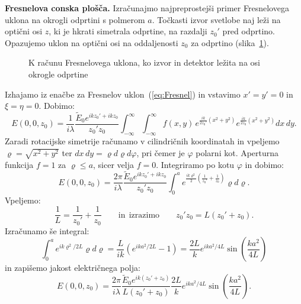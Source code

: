 \begin{example}{\bf Fresnelova conska plošča.}
Izračunajmo najpreprostejši primer Fresnelovega uklona na 
okrogli odprtini s polmerom $a$. Točkasti izvor svetlobe naj leži na 
optični osi $z$, ki je hkrati simetrala odprtine, na 
razdalji $z_0'$ pred odprtino. Opazujemo uklon
na optični osi na oddaljenosti $z_0$ za odprtino (slika~\ref{fig:05_FresCona}).
\begin{figure}[ht]
\centering
\def\svgwidth{100truemm} 

\caption{K računu Fresnelovega uklona, ko izvor in 
detektor ležita na osi okrogle odprtine}
\label{fig:05_FresCona}
\end{figure}

Izhajamo iz enačbe za Fresnelov uklon~(\ref{eq:Fresnel}) in vstavimo 
$x'=y'=0$ in $\xi = \eta = 0$. Dobimo:
\begin{equation}
E(0,0, z_0) = \frac{1}{i\lambda} \frac{\tilde{E}_0 
e^{ikz_0'+ikz_0}}{z_0'z_0} \int_{-\infty}^{\infty}
\int_{-\infty}^{\infty} f(x,y)\,
e^{\frac{ik}{2z_0'}(x^2+y^2)} e^{\frac{ik}{2z_0}(x^2+y^2)} dx\, dy.
\label{eq:05_77}
\end{equation}
Zaradi rotacijske simetrije računamo v cilindričnih koordinatah in 
vpeljemo $\varrho = \sqrt{x^2 + y^2}$ ter $dx\,dy = \varrho d\varrho d\varphi$,
pri čemer je $\varphi$ polarni kot. Aperturna funkcija $f=1$ 
za $\varrho \leq a$, sicer velja $f= 0$. Integriramo po kotu $\varphi$ 
in dobimo:
\begin{equation}
E(0,0, z_0) = \frac{2\pi }{i\lambda} \frac{\tilde{E}_0 e^{ikz_0'+ikz_0}}{z_0'z_0} \int_{0}^{a}
e^{\frac{ik\varrho^2}{2}\left(\frac{1}{z_0'}+\frac{1}{z_0}\right)}\varrho d\varrho.
\label{eq:05_79}
\end{equation}
Vpeljemo:
\begin{equation}
\frac{1}{L} = \frac{1}{z_0'} + \frac{1}{z_0} \qquad \mathrm{in~~izrazimo} \qquad z_0'z_0 = L(z_0'+z_0).
\label{eq:05_80}
\end{equation}
Izračunamo še integral:
\begin{equation}
\int_0^a e^{ik\varrho^2/2L}\varrho d\varrho = \frac{L}{ik}\left(e^{ika^2/2L}-1\right) = 
\frac{2L}{k}e^{ika^2/4L} \sin\left(\frac{ka^2}{4L}\right)
\label{eq:05_81}
\end{equation}
in zapišemo jakost električnega polja:
\begin{equation}
E(0,0, z_0) = \frac{2\pi}{i\lambda} \frac{\tilde{E}_0 e^{ik(z_0'+z_0)}}{L(z_0'+z_0)} 
\frac{2L}{k}e^{ika^2/4L} \sin\left(\frac{ka^2}{4L}\right)\!\!.

\end{equation}
\end{example}
